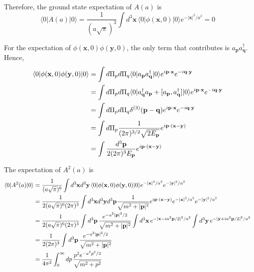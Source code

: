 \documentclass[a4paper,11pt]{article}
\begin{document}
Therefore, the ground state expectation of $A(a)$ is
\begin{equation}
    \langle 0|A(a)|0\rangle  = \frac{1}{(a\sqrt{\pi})^3}\int d^3\mathbf{x}\, \langle 0|\phi(\mathbf{x}, 0)|0\rangle e^{-|\mathbf{x}|^2/a^2} = 0
\end{equation}

For the expectation of $\phi(\mathbf{x}, 0)\phi(\mathbf{y}, 0)$, the only term that contributes is $a_{\mathbf{p}}a_{\mathbf{q}}^\dagger$. Hence,
\begin{align}
    \langle0|\phi(\mathbf{x}, 0)\phi(\mathbf{y}, 0)|0\rangle 
    &= \int d\Pi_p d\Pi_q \langle0|a_{\mathbf{p}}a_{\mathbf{q}}^\dagger|0\rangle e^{i\mathbf{p}\cdot \mathbf{x}}e^{-i\mathbf{q}\cdot \mathbf{y}}\notag\\
    &= \int d\Pi_p d\Pi_q \langle0|a_{\mathbf{q}}^\dagger a_{\mathbf{p}} + [a_{\mathbf{p}}, a_{\mathbf{q}}^\dagger]|0\rangle e^{i\mathbf{p}\cdot \mathbf{x}}e^{-i\mathbf{q}\cdot \mathbf{y}}\notag\\
    &= \int d\Pi_p d\Pi_q \delta^{(3)}(\mathbf{p}-\mathbf{q}) e^{i\mathbf{p}\cdot \mathbf{x}}e^{-i\mathbf{q}\cdot \mathbf{y}}\notag\\
    &= \int d\Pi_p \frac{1}{(2\pi)^{3/2}\sqrt{2E_{\mathbf{p}}}}e^{i\mathbf{p}\cdot (\mathbf{x}-\mathbf{y})}\notag\\
    &= \int \frac{d^3\mathbf{p}}{2(2\pi)^{3}E_{\mathbf{p}}} e^{i\mathbf{p}\cdot (\mathbf{x}-\mathbf{y})}
\end{align}

The expectation of $A^2(a)$ is
\begin{align}
    \langle 0|A^2(a)|0\rangle 
    &= \frac{1}{(a\sqrt{\pi})^6}\int d^3\mathbf{x}d^3\mathbf{y}\, \langle 0|\phi(\mathbf{x}, 0)\phi(\mathbf{y}, 0)|0\rangle e^{-|\mathbf{x}|^2/a^2}e^{-|\mathbf{y}|^2/a^2}\notag\\
    &= \frac{1}{2(a\sqrt{\pi})^6(2\pi)^{3}}\int d^3\mathbf{x}d^3\mathbf{y}d^3\mathbf{p} \frac{1}{\sqrt{m^2 + |\mathbf{p}|^2}}e^{i\mathbf{p}\cdot (\mathbf{x}-\mathbf{y})} e^{-|\mathbf{x}|^2/a^2}e^{-|\mathbf{y}|^2/a^2}\notag\\
    &=\frac{1}{2(a\sqrt{\pi})^6(2\pi)^{3}}\int d^3\mathbf{p}\,\frac{e^{-a^2|\mathbf{p}|^2/2}}{\sqrt{m^2 + |\mathbf{p}|^2}}\int d^3\mathbf{x}\,e^{-|\mathbf{x} - ia^2\mathbf{p}/2|^2/a^2}\int d^3\mathbf{y}\, e^{-|\mathbf{y} + ia^2\mathbf{p}/2|^2/a^2}\notag\\
    &=\frac{1}{2(2\pi)^3}\int d^3\mathbf{p}\,\frac{e^{-a^2|\mathbf{p}|^2/2}}{\sqrt{m^2 + |\mathbf{p}|^2}}\notag\\
    &=\frac{1}{4\pi^2}\int_0^\infty dp\,\frac{p^2 e^{-a^2p^2/2}}{\sqrt{m^2 + p^2}}
\end{align}
\end{document}
